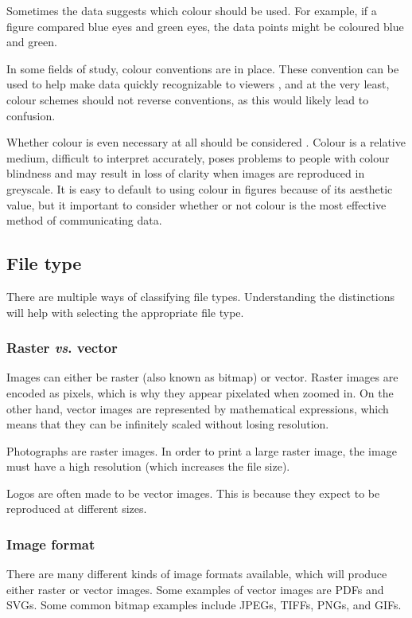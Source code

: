 \documentclass[letterpaper]{report}\usepackage[]{graphicx}\usepackage[]{color}
\begin{document}
Sometimes the data suggests which colour should be used. For example, if a figure compared blue eyes and green eyes, the data points might be coloured blue and green. 

In some fields of study, colour conventions are in place. These convention can be used to help make data quickly recognizable to viewers \cite{rheingans}, and at the very least, colour schemes should not reverse conventions, as this would likely lead to confusion. 

Whether colour is even necessary at all should be considered \cite{wong-avoid-colour}. Colour is a relative medium, difficult to interpret accurately, poses problems to people with colour blindness and may result in loss of clarity when images are reproduced in greyscale. It is easy to default to using colour in figures because of its aesthetic value, but it important to consider whether or not colour is the most effective method of communicating data.

\subsection{File type}
There are multiple ways of classifying file types. Understanding the distinctions will help with selecting the appropriate file type.

\subsubsection{Raster \textit{vs}. vector}
Images can either be raster (also known as bitmap) or vector. Raster images are encoded as pixels, which is why they appear pixelated when zoomed in. On the other hand, vector images are represented by mathematical expressions, which means that they can be infinitely scaled without losing resolution. 

Photographs are raster images. In order to print a large raster image, the image must have a high resolution (which increases the file size). 

Logos are often made to be vector images. This is because they expect to be reproduced at different sizes. 

\subsubsection{Image format}
There are many different kinds of image formats available, which will produce either raster or vector images. Some examples of vector images are PDFs and SVGs. Some common bitmap examples include JPEGs, TIFFs, PNGs, and GIFs. 
\end{document}
